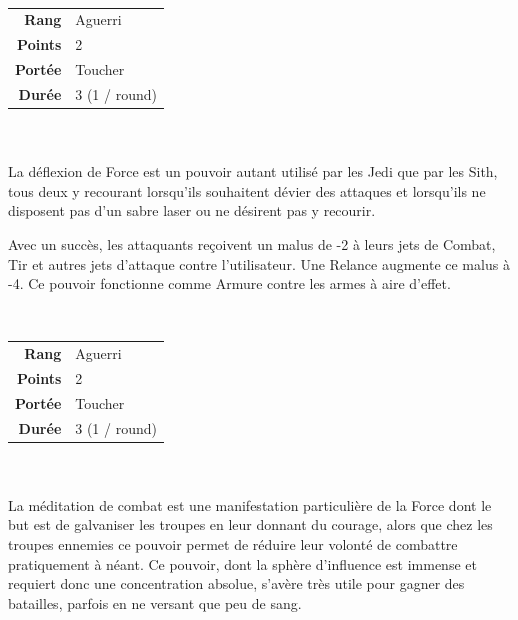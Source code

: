 \begin{description}[align=left] 

    \item [Déflexion de Force] ~ \\

        \begin{tabular}{ r l }
            \textbf{Rang}    & Aguerri \\
            \textbf{Points}  & 2 \\
            \textbf{Portée}  & Toucher \\
            \textbf{Durée}   & 3 (1 / round) \\
        \end{tabular}
        \\ \\
        La déflexion de Force est un pouvoir autant utilisé par les Jedi que par les Sith, tous deux y recourant lorsqu'ils souhaitent dévier des attaques et lorsqu'ils ne disposent pas d'un sabre laser ou ne désirent pas y recourir.

        Avec un succès, les attaquants reçoivent un malus de -2 à leurs jets de Combat, Tir et autres jets d’attaque contre l’utilisateur. Une Relance augmente ce malus à -4. Ce pouvoir fonctionne comme Armure contre les armes à aire d’effet.
        \\

    \item [Méditation de Combat] ~ \\

        \begin{tabular}{ r l }
            \textbf{Rang}    & Aguerri \\
            \textbf{Points}  & 2 \\
            \textbf{Portée}  & Toucher \\
            \textbf{Durée}   & 3 (1 / round) \\
        \end{tabular}
        \\ \\
        La méditation de combat est une manifestation particulière de la Force dont le but est de galvaniser les troupes en leur donnant du courage, alors que chez les troupes ennemies ce pouvoir permet de réduire leur volonté de combattre pratiquement à néant. Ce pouvoir, dont la sphère d'influence est immense et requiert donc une concentration absolue, s'avère très utile pour gagner des batailles, parfois en ne versant que peu de sang.


\end{description}
